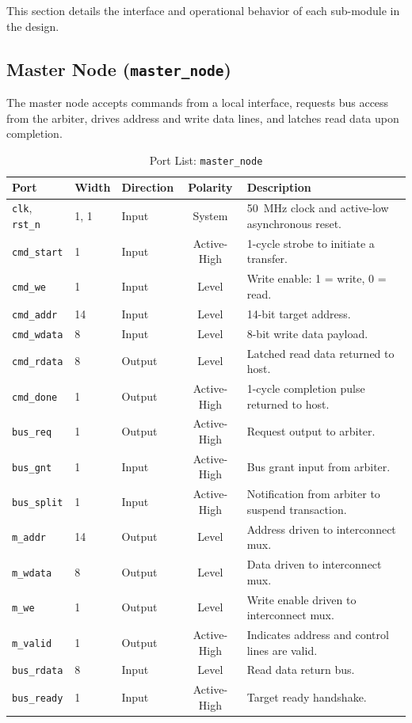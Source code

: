 \documentclass[11pt,a4paper]{article}
\begin{document}
This section details the interface and operational behavior of each sub-module in the design.

\subsection{Master Node (\texttt{master\_node})}
The master node accepts commands from a local interface, requests bus access from the arbiter, drives address and write data lines, and latches read data upon completion.

\begin{table}[h!]
\centering
\caption{Port List: \texttt{master\_node}}
\small
\begin{tabularx}{\textwidth}{lllcX}
\toprule
\textbf{Port} & \textbf{Width} & \textbf{Direction} & \textbf{Polarity} & \textbf{Description} \\
\midrule
\texttt{clk}, \texttt{rst\_n} & 1, 1 & Input & System & 50~MHz clock and active-low asynchronous reset. \\
\texttt{cmd\_start} & 1 & Input & Active-High & 1-cycle strobe to initiate a transfer. \\
\texttt{cmd\_we} & 1 & Input & Level & Write enable: 1 = write, 0 = read. \\
\texttt{cmd\_addr} & 14 & Input & Level & 14-bit target address. \\
\texttt{cmd\_wdata} & 8 & Input & Level & 8-bit write data payload. \\
\texttt{cmd\_rdata} & 8 & Output & Level & Latched read data returned to host. \\
\texttt{cmd\_done} & 1 & Output & Active-High & 1-cycle completion pulse returned to host. \\
\texttt{bus\_req} & 1 & Output & Active-High & Request output to arbiter. \\
\texttt{bus\_gnt} & 1 & Input & Active-High & Bus grant input from arbiter. \\
\texttt{bus\_split} & 1 & Input & Active-High & Notification from arbiter to suspend transaction. \\
\texttt{m\_addr} & 14 & Output & Level & Address driven to interconnect mux. \\
\texttt{m\_wdata} & 8 & Output & Level & Data driven to interconnect mux. \\
\texttt{m\_we} & 1 & Output & Level & Write enable driven to interconnect mux. \\
\texttt{m\_valid} & 1 & Output & Active-High & Indicates address and control lines are valid. \\
\texttt{bus\_rdata} & 8 & Input & Level & Read data return bus. \\
\texttt{bus\_ready} & 1 & Input & Active-High & Target ready handshake. \\
\bottomrule
\end{tabularx}
\end{table}
\end{document}
